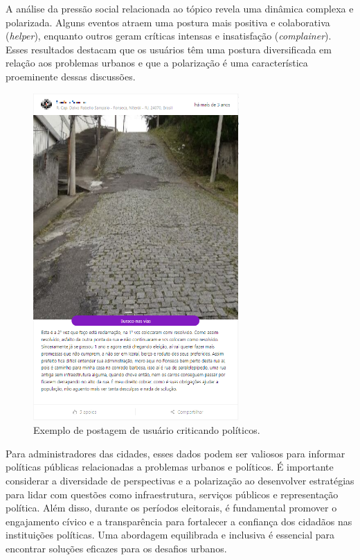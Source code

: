 A análise da pressão social relacionada ao tópico revela uma dinâmica complexa e polarizada. Alguns eventos atraem uma postura mais positiva e colaborativa (\textit{helper}), enquanto outros geram críticas intensas e insatisfação (\textit{complainer}). Esses resultados destacam que os usuários têm uma postura diversificada em relação aos problemas urbanos e que a polarização é uma característica proeminente dessas discussões.

\begin{figure}[htb]
	\centering
	\includegraphics[width=0.7\textwidth]{images/colab_posts_polititians_2.png}
	\caption{Exemplo de postagem de usuário criticando políticos.}
	\label{fig:colab_posts_polititians_2}
\end{figure}

Para administradores das cidades, esses dados podem ser valiosos para informar políticas públicas relacionadas a problemas urbanos e políticos. É importante considerar a diversidade de perspectivas e a polarização ao desenvolver estratégias para lidar com questões como infraestrutura, serviços públicos e representação política. Além disso, durante os períodos eleitorais, é fundamental promover o engajamento cívico e a transparência para fortalecer a confiança dos cidadãos nas instituições políticas. Uma abordagem equilibrada e inclusiva é essencial para encontrar soluções eficazes para os desafios urbanos.

